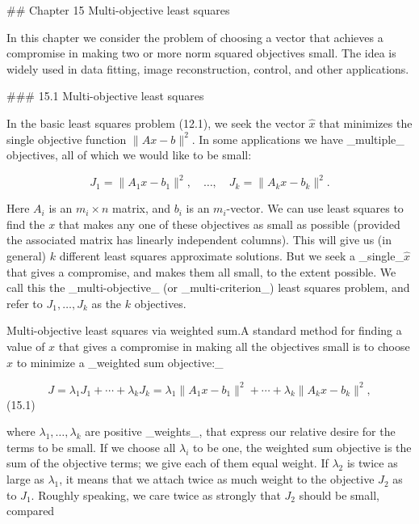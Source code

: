

## Chapter 15 Multi-objective least squares

In this chapter we consider the problem of choosing a vector that achieves a compromise in making two or more norm squared objectives small. The idea is widely used in data fitting, image reconstruction, control, and other applications.

### 15.1 Multi-objective least squares

In the basic least squares problem (12.1), we seek the vector \(\hat{x}\) that minimizes the single objective function \(\|Ax-b\|^{2}\). In some applications we have _multiple_ objectives, all of which we would like to be small:

\[J_{1}=\|A_{1}x-b_{1}\|^{2},\quad\ldots,\quad J_{k}=\|A_{k}x-b_{k}\|^{2}.\]

Here \(A_{i}\) is an \(m_{i}\times n\) matrix, and \(b_{i}\) is an \(m_{i}\)-vector. We can use least squares to find the \(x\) that makes any one of these objectives as small as possible (provided the associated matrix has linearly independent columns). This will give us (in general) \(k\) different least squares approximate solutions. But we seek a _single_\(\hat{x}\) that gives a compromise, and makes them all small, to the extent possible. We call this the _multi-objective_ (or _multi-criterion_) least squares problem, and refer to \(J_{1},\ldots,J_{k}\) as the \(k\) objectives.

Multi-objective least squares via weighted sum.A standard method for finding a value of \(x\) that gives a compromise in making all the objectives small is to choose \(x\) to minimize a _weighted sum objective:_

\[J=\lambda_{1}J_{1}+\cdots+\lambda_{k}J_{k}=\lambda_{1}\|A_{1}x-b_{1}\|^{2}+ \cdots+\lambda_{k}\|A_{k}x-b_{k}\|^{2},\] (15.1)

where \(\lambda_{1},\ldots,\lambda_{k}\) are positive _weights_, that express our relative desire for the terms to be small. If we choose all \(\lambda_{i}\) to be one, the weighted sum objective is the sum of the objective terms; we give each of them equal weight. If \(\lambda_{2}\) is twice as large as \(\lambda_{1}\), it means that we attach twice as much weight to the objective \(J_{2}\) as to \(J_{1}\). Roughly speaking, we care twice as strongly that \(J_{2}\) should be small, compared